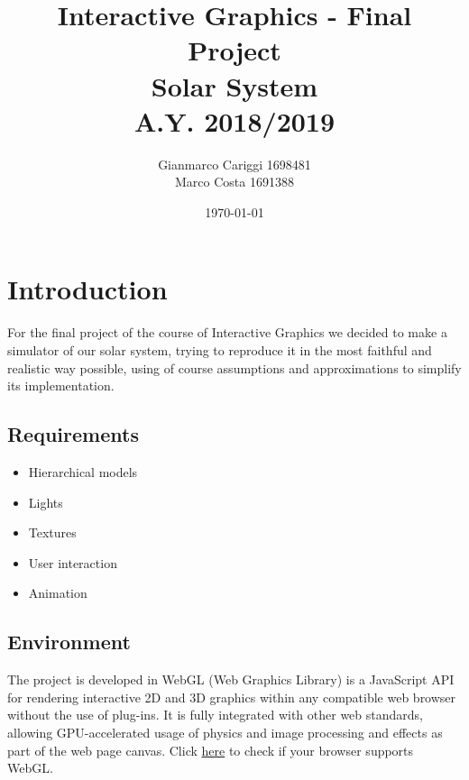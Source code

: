 \documentclass{article}
\begin{document}
\title{\textbf{Interactive Graphics - Final Project}
		\\ \medskip \textbf{Solar System}
		\\ \medskip \large A.Y. 2018/2019 }
\date{\today}
\author{Gianmarco Cariggi 1698481 \\ \medskip Marco Costa 1691388}
\maketitle

\section{Introduction}
For the final project of the course of Interactive Graphics we decided to make a simulator of our solar system, trying to reproduce it in the most faithful and realistic way possible, using of course assumptions and approximations to simplify its implementation.

\subsection{Requirements}
\begin{itemize}
	\item Hierarchical models
	\item Lights
	\item Textures
	\item User interaction
	\item Animation
\end{itemize}

\subsection{Environment}
The project is developed in WebGL (Web Graphics Library) is a JavaScript API for rendering interactive 2D and 3D graphics within any compatible web browser without the use of plug-ins. It is fully integrated with other web standards, allowing GPU-accelerated usage of physics and image processing and effects as part of the web page canvas.
\newline
Click \href{https://get.webgl.org/}{here} to check if your browser supports WebGL.
\end{document}
